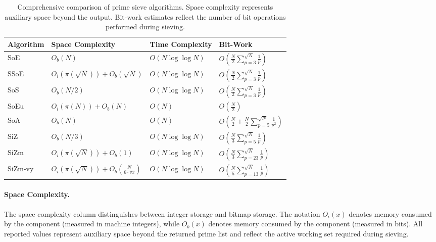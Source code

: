 \documentclass{article}
\begin{document}
\begin{table}[H]
    \centering
    \renewcommand{\arraystretch}{2.5}
    \begin{tabular}{l|l|l|l}
        \hline
        \textbf{Algorithm} \quad\quad & \textbf{Space Complexity} & \textbf{Time Complexity} & \textbf{Bit-Work} \\
        \hline
        SoE & $O_b(N)$ & $O(N \log \log N)$ & $O\left(\frac{N}{2}\sum_{p=3}^{\sqrt N}\frac{1}{p}\right)$ \\
        SSoE & $O_i(\pi(\sqrt{N})) + O_b(\sqrt{N})$ & $O(N \log \log N)$ & $O\left(\frac{N}{2}\sum_{p=3}^{\sqrt N}\frac{1}{p}\right)$ \\
        SoS & $O_b(N/2)$ & $O(N \log \log N)$ & $O\left(\frac{N}{2}\sum_{p=3}^{\sqrt N}\frac{1}{p}\right)$ \\
        SoEu & $O_i(\pi(N)) + O_b(N)$ & $O(N)$ & $O\left(\frac{N}{2}\right)$ \\
        SoA & $O_b(N)$ & $O(N)$ & $O\left(\frac{N}{2} + \frac{N}{2}\sum_{p=5}^{\sqrt N}\frac{1}{p^2}\right)$ \\
        SiZ & $O_b(N/3)$ & $O(N \log \log N)$ & $O\left(\frac{N}{3}\sum_{p=5}^{\sqrt N}\frac{1}{p}\right)$ \\
        SiZm & $O_i(\pi(\sqrt{N})) + O_b(1)$ & $O(N \log \log N)$ & $O\left(\frac{N}{3}\sum_{p=23}^{\sqrt N}\frac{1}{p}\right)$ \\
        SiZm-vy & $O_i(\pi(\sqrt{N})) + O_b\left(\tfrac{N}{6 \cdot vx}\right)$ & $O(N \log \log N)$ & $O\left(\frac{N}{5}\sum_{p=13}^{\sqrt N}\frac{1}{p}\right)$ \\
        \hline
    \end{tabular}
    \caption{Comprehensive comparison of prime sieve algorithms. Space complexity represents auxiliary space beyond the output. Bit-work estimates reflect the number of bit operations performed during sieving.}
    \label{tab:prime_sieves_summary}
\end{table}


\paragraph{Space Complexity.}
The space complexity column distinguishes between integer storage and bitmap storage. The notation $O_i(x)$ denotes memory consumed by the  component (measured in machine integers), while $O_b(x)$ denotes memory consumed by the  component (measured in bits). All reported values represent auxiliary space beyond the returned prime list and reflect the active working set required during sieving.
\end{document}
